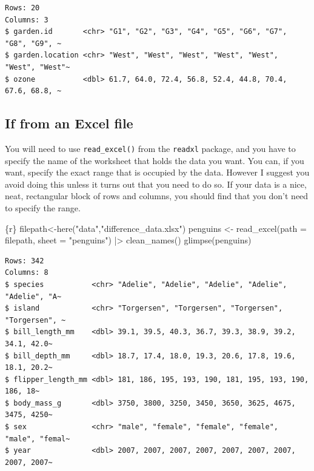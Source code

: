 \documentclass[
  letterpaper,
  DIV=11,
  numbers=noendperiod]{scrreprt}
\newenvironment{Shaded}{\begin{snugshade}}{\end{snugshade}}
\newcommand{\InformationTok}[1]{\textcolor[rgb]{0.37,0.37,0.37}{#1}}
\begin{document}
\begin{verbatim}
Rows: 20
Columns: 3
$ garden.id       <chr> "G1", "G2", "G3", "G4", "G5", "G6", "G7", "G8", "G9", ~
$ garden.location <chr> "West", "West", "West", "West", "West", "West", "West"~
$ ozone           <dbl> 61.7, 64.0, 72.4, 56.8, 52.4, 44.8, 70.4, 67.6, 68.8, ~
\end{verbatim}

\subsection{If from an Excel file}\label{if-from-an-excel-file}

You will need to use \texttt{read\_excel()} from the \texttt{readxl}
package, and you have to specify the name of the worksheet that holds
the data you want. You can, if you want, specify the exact range that is
occupied by the data. However I suggest you avoid doing this unless it
turns out that you need to do so. If your data is a nice, neat,
rectangular block of rows and columns, you should find that you don't
need to specify the range.

\begin{Shaded}
\begin{Highlighting}[]
\InformationTok{\textasciigrave{}\textasciigrave{}\textasciigrave{}\{r\}}
\InformationTok{filepath\textless{}{-}here("data","difference\_data.xlsx")}
\InformationTok{penguins \textless{}{-} read\_excel(path = filepath, sheet = "penguins") |\textgreater{}}
\InformationTok{  clean\_names()}
\InformationTok{glimpse(penguins)}
\InformationTok{\textasciigrave{}\textasciigrave{}\textasciigrave{}}
\end{Highlighting}
\end{Shaded}

\begin{verbatim}
Rows: 342
Columns: 8
$ species           <chr> "Adelie", "Adelie", "Adelie", "Adelie", "Adelie", "A~
$ island            <chr> "Torgersen", "Torgersen", "Torgersen", "Torgersen", ~
$ bill_length_mm    <dbl> 39.1, 39.5, 40.3, 36.7, 39.3, 38.9, 39.2, 34.1, 42.0~
$ bill_depth_mm     <dbl> 18.7, 17.4, 18.0, 19.3, 20.6, 17.8, 19.6, 18.1, 20.2~
$ flipper_length_mm <dbl> 181, 186, 195, 193, 190, 181, 195, 193, 190, 186, 18~
$ body_mass_g       <dbl> 3750, 3800, 3250, 3450, 3650, 3625, 4675, 3475, 4250~
$ sex               <chr> "male", "female", "female", "female", "male", "femal~
$ year              <dbl> 2007, 2007, 2007, 2007, 2007, 2007, 2007, 2007, 2007~
\end{verbatim}
\end{document}
